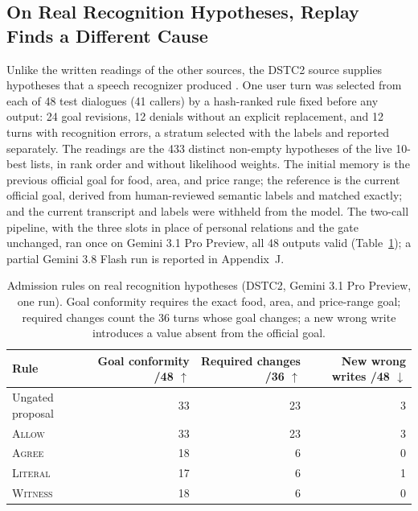\documentclass[acmsmall,review,anonymous]{acmart}
\newcommand{\agree}{\textsc{Agree}}
\newcommand{\allow}{\textsc{Allow}}
\newcommand{\literal}{\textsc{Literal}}
\newcommand{\witness}{\textsc{Witness}}
\begin{document}
\subsection{On Real Recognition Hypotheses, Replay Finds a Different Cause}\label{sec:dstc2}
Unlike the written readings of the other sources, the DSTC2 source supplies hypotheses that a speech recognizer produced \cite{cite12}. One user turn was selected from each of 48 test dialogues (41 callers) by a hash-ranked rule fixed before any output: 24 goal revisions, 12 denials without an explicit replacement, and 12 turns with recognition errors, a stratum selected with the labels and reported separately. The readings are the 433 distinct non-empty hypotheses of the live 10-best lists, in rank order and without likelihood weights. The initial memory is the previous official goal for food, area, and price range; the reference is the current official goal, derived from human-reviewed semantic labels and matched exactly; and the current transcript and labels were withheld from the model. The two-call pipeline, with the three slots in place of personal relations and the gate unchanged, ran once on Gemini 3.1 Pro Preview, all 48 outputs valid (Table~\ref{tab:dstc2}); a partial Gemini 3.8 Flash run is reported in Appendix~J.

\begin{table}[tbp]
\centering
\caption{Admission rules on real recognition hypotheses (DSTC2, Gemini 3.1 Pro Preview, one run). Goal conformity requires the exact food, area, and price-range goal; required changes count the 36 turns whose goal changes; a new wrong write introduces a value absent from the official goal.}\label{tab:dstc2}
\small
\setlength{\tabcolsep}{3pt}
\begin{tabular}{@{}lrrr@{}}
\toprule
\textbf{Rule} & \textbf{Goal conformity /48 $\uparrow$} & \textbf{Required changes /36 $\uparrow$} & \textbf{New wrong writes /48 $\downarrow$} \\
\midrule
Ungated proposal & 33 & 23 & 3 \\
\allow{} & 33 & 23 & 3 \\
\agree{} & 18 & 6 & 0 \\
\literal{} & 17 & 6 & 1 \\
\witness{} & 18 & 6 & 0 \\
\bottomrule
\end{tabular}
\end{table}
\end{document}

